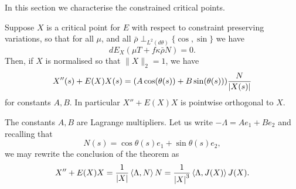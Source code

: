 
In this section we characterise the constrained critical points.

\begin{thm}
\label{thm:constrained_critical}
Suppose \(X\) is a critical point for \(E\) with respect to constraint preserving variations, so that for all %
\({\mu}\), and all \(\bar{\rho} \perp_{L^2(d\theta)} \{\cos, \sin\}\) we have
\[
dE_X({\mu} T + f\kappa \bar{\rho} N) = 0.
\]
Then, if \(X\) is normalised so that \(\|X\|_2 = 1\), we have   
\begin{equation}
X''(s) + E(X) X(s) = (A \cos(\theta(s)) + B \sin(\theta(s))) \frac{N}{\left|{X(s)}\right|}   \label{AMI}
\end{equation}
for constants \(A, B\). %
 In particular \(X'' + E(X) X\) is pointwise orthogonal to \(X\).
\end{thm}




\begin{rem}
The constants \(A, B\) are Lagrange multipliers. Let us write \(-\Lambda = A e_1 + B e_2\) and recalling that
\[
N(s) = \cos\theta(s) e_1 + \sin\theta(s) e_2,
\]
we may rewrite the conclusion of the theorem as
\begin{equation}
\label{eq:constrained_EL}
X'' + E(X) X = \frac{1}{\left|{X}\right|} \left\langle{\Lambda},{N}\right\rangle N = \frac{1}{\left|{X}\right|^3} \left\langle{\Lambda},{J(X)}\right\rangle J(X).
\end{equation}
\end{rem}

